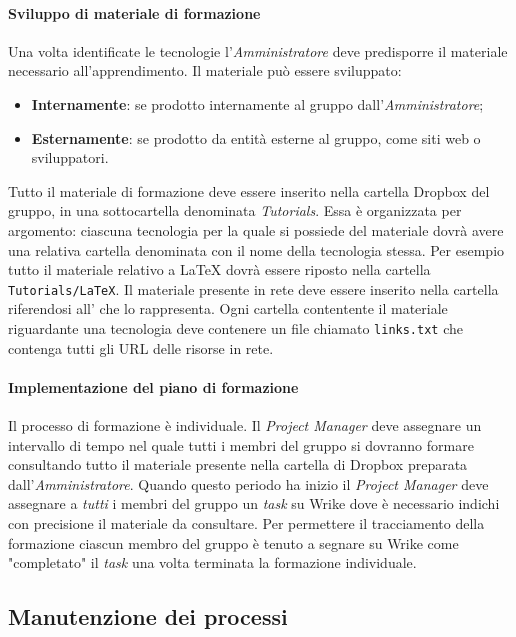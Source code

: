 	\paragraph{Sviluppo di materiale di formazione} \Spazio
	Una volta identificate le tecnologie l'\emph{Amministratore} deve predisporre il materiale necessario all'apprendimento. Il materiale può essere sviluppato: 
	\begin{itemize}
		\item \textbf{Internamente}: se prodotto internamente al gruppo dall'\emph{Amministratore};
		\item \textbf{Esternamente}: se prodotto da entità esterne al gruppo, come siti web o sviluppatori.
	\end{itemize}
	Tutto il materiale di formazione deve essere inserito nella cartella Dropbox del gruppo, in una sottocartella denominata \emph{Tutorials}. Essa è organizzata per argomento: ciascuna tecnologia per la quale si possiede del materiale dovrà avere una relativa cartella denominata con il nome della tecnologia stessa. Per esempio tutto il materiale relativo a \LaTeX\text{ } dovrà essere riposto nella cartella \texttt{Tutorials/LaTeX}. Il materiale presente in rete deve essere inserito nella cartella riferendosi all' che lo rappresenta. Ogni cartella contentente il materiale riguardante una tecnologia deve contenere un file chiamato \texttt{links.txt} che contenga tutti gli URL delle risorse in rete. 

	\paragraph{Implementazione del piano di formazione} \Spazio
	Il processo di formazione è individuale. Il \emph{Project Manager} deve assegnare un intervallo di tempo nel quale tutti i membri del gruppo si dovranno formare consultando tutto il materiale presente nella cartella di Dropbox preparata dall'\emph{Amministratore}. Quando questo periodo ha inizio il \emph{Project Manager} deve assegnare a \emph{tutti} i membri del gruppo un \emph{task} su Wrike dove è necessario indichi con precisione il materiale da consultare. Per permettere il tracciamento della formazione ciascun membro del gruppo è tenuto a segnare su Wrike come "completato" il \emph{task} una volta terminata la formazione individuale.


\subsection{Manutenzione dei processi}
\label{sec:manutenzioneProcessi}
